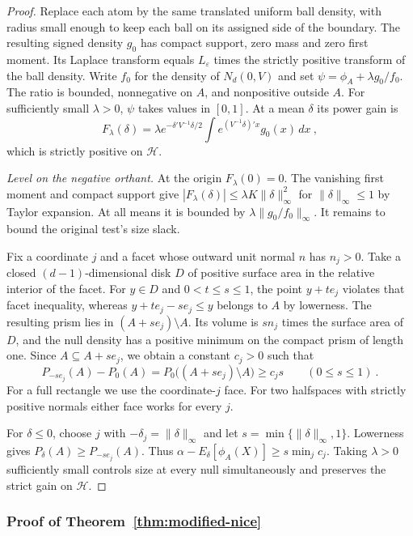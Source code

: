 \documentclass[11pt]{article}
\numberwithin{equation}{section}
\theoremstyle{definition}
\begin{document}
{{\begin{proof}
Replace each atom by the same translated uniform ball density, with radius small enough to keep each ball on its assigned side of the boundary. The resulting signed density $g_0$ has compact support, zero mass and zero first moment. Its Laplace transform equals $L_\varepsilon$ times the strictly positive transform of the ball density. Write $f_0$ for the density of $N_d(0,V)$ and set $\psi=\phi_A+\lambda g_0/f_0$. The ratio is bounded, nonnegative on $A$, and nonpositive outside $A$. For sufficiently small $\lambda>0$, $\psi$ takes values in $[0,1]$. At a mean $\delta$ its power gain is
\[
 F_\lambda(\delta)=\lambda e^{-\delta'V^{-1}\delta/2}
             \int e^{(V^{-1}\delta)'x}g_0(x)\,dx~,
\]
which is strictly positive on $\mathcal H$.

\emph{Level on the negative orthant.}
At the origin $F_\lambda(0)=0$. The vanishing first moment and compact support give $|F_\lambda(\delta)|\le\lambda K\|\delta\|_\infty^2$ for $\|\delta\|_\infty\le1$ by Taylor expansion. At all means it is bounded by $\lambda\|g_0/f_0\|_\infty$. It remains to bound the original test's size slack.

Fix a coordinate $j$ and a facet whose outward unit normal $n$ has $n_j>0$. Take a closed $(d-1)$-dimensional disk $D$ of positive surface area in the relative interior of the facet. For $y\in D$ and $0<t\le s\le1$, the point $y+te_j$ violates that facet inequality, whereas $y+te_j-se_j\le y$ belongs to $A$ by lowerness. The resulting prism lies in $(A+se_j)\setminus A$. Its volume is $s n_j$ times the surface area of $D$, and the null density has a positive minimum on the compact prism of length one. Since $A\subseteq A+se_j$, we obtain a constant $c_j>0$ such that
\[
 P_{-se_j}(A)-P_0(A)=P_0\big((A+se_j)\setminus A\big)\ge c_j s
 \qquad(0\le s\le1)~.
\]
For a full rectangle we use the coordinate-$j$ face. For two halfspaces with strictly positive normals either face works for every $j$.

For $\delta\le0$, choose $j$ with $-\delta_j=\|\delta\|_\infty$ and let $s=\min\{\|\delta\|_\infty,1\}$. Lowerness gives $P_\delta(A)\ge P_{-s e_j}(A)$. Thus $\alpha-E_\delta[\phi_A(X)]\ge s\min_j c_j$. Taking $\lambda>0$ sufficiently small controls size at every null simultaneously and preserves the strict gain on $\mathcal H$.
\end{proof}
}

{\color{red}\subsubsection*{Proof of Theorem~\ref{thm:modified-nice}}}

}
\end{document}
